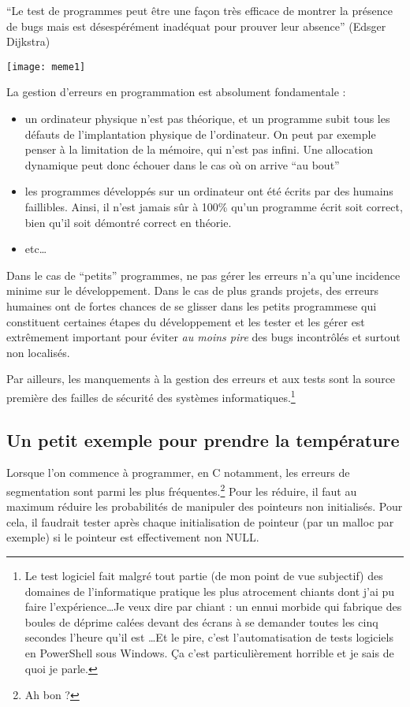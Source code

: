 \documentclass[../../../main.tex]{subfiles}
\begin{document}
``Le test de programmes peut être une façon très efficace de montrer la présence de bugs mais est désespérément inadéquat pour prouver leur absence'' (Edsger Dijkstra)

\begin{minipage}{\textwidth}
	\begin{center}
		\texttt{[image: meme1]}
	\end{center}
\end{minipage}

La gestion d'erreurs en programmation est absolument fondamentale :
\begin{itemize}
	\item un ordinateur physique n'est pas théorique, et un programme subit tous les défauts de l'implantation physique de l'ordinateur. On peut par exemple penser à la limitation de la mémoire, qui n'est pas infini. Une allocation dynamique peut donc échouer dans le cas où on arrive ``au bout''
	\item les programmes développés sur un ordinateur ont été écrits par des humains faillibles. Ainsi, il n'est jamais sûr à 100\% qu'un programme écrit soit correct, bien qu'il soit démontré correct en théorie.
	\item etc\dots
\end{itemize}
Dans le cas de ``petits'' programmes, ne pas gérer les erreurs n'a qu'une incidence minime sur le développement. Dans le cas de plus grands projets, des erreurs humaines ont de fortes chances de se glisser dans les petits programmese qui constituent certaines étapes du développement et les tester et les gérer est extrêmement important pour éviter \textit{au moins pire} des bugs incontrôlés et surtout non localisés.

Par ailleurs, les manquements à la gestion des erreurs et aux tests sont la source première des failles de sécurité des systèmes informatiques.\footnote{Le test logiciel fait malgré tout partie (de mon point de vue subjectif) des domaines de l'informatique pratique les plus atrocement chiants dont j'ai pu faire l'expérience\dots Je veux dire par chiant : un ennui morbide qui fabrique des boules de déprime calées devant des écrans à se demander toutes les cinq secondes l'heure qu'il est \dots Et le pire, c'est l'automatisation de tests logiciels en PowerShell sous Windows. Ça c'est particulièrement horrible et je sais de quoi je parle.}
\subsection{Un petit exemple pour prendre la température}
Lorsque l'on commence à programmer, en C notamment, les erreurs de segmentation sont parmi les plus fréquentes.\footnote{Ah bon ?} Pour les réduire, il faut au maximum réduire les probabilités de manipuler des
pointeurs non initialisés. Pour cela, il faudrait tester après chaque initialisation de pointeur (par un malloc par exemple) si le pointeur est effectivement non \textsf{NULL}.
\end{document}
